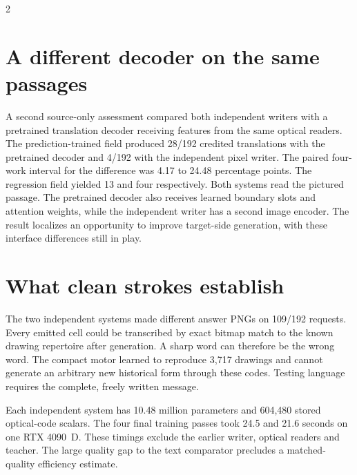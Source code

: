 \begin{multicols}{2}
\section*{A different decoder on the same passages}
A second source-only assessment compared both independent writers with a pretrained translation decoder receiving features from the same optical readers. The prediction-trained field produced 28/192 credited translations with the pretrained decoder and 4/192 with the independent pixel writer. The paired four-work interval for the difference was 4.17 to 24.48 percentage points. The regression field yielded 13 and four respectively. Both systems read the pictured passage. The pretrained decoder also receives learned boundary slots and attention weights, while the independent writer has a second image encoder. The result localizes an opportunity to improve target-side generation, with these interface differences still in play.
\section*{What clean strokes establish}
The two independent systems made different answer PNGs on 109/192 requests. Every emitted cell could be transcribed by exact bitmap match to the known drawing repertoire after generation. A sharp word can therefore be the wrong word. The compact motor learned to reproduce 3,717 drawings and cannot generate an arbitrary new historical form through these codes. Testing language requires the complete, freely written message.
\par Each independent system has 10.48 million parameters and 604,480 stored optical-code scalars. The four final training passes took 24.5 and 21.6 seconds on one RTX 4090~D. These timings exclude the earlier writer, optical readers and teacher. The large quality gap to the text comparator precludes a matched-quality efficiency estimate.
\end{multicols}
